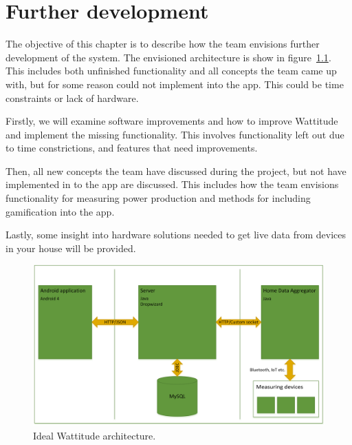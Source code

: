 \chapter{Further development}
\label{chapter:further}

The objective of this chapter is to describe how the team envisions further development of the system. The envisioned architecture is show in figure~\ref{fig:idealArchitecture}. This includes both unfinished functionality and all concepts the team came up with, but for some reason could not implement into the app. This could be time constraints or lack of hardware.

Firstly, we will examine software improvements and how to improve Wattitude and implement the missing functionality. This involves functionality left out due to time constrictions, and features that need improvements. 

Then, all new concepts the team have discussed during the project, but not have implemented in to the app are discussed. This includes how the team envisions functionality for measuring power production and methods for including gamification into the app. 

Lastly, some insight into hardware solutions needed to get live data from devices in your house will be provided. 

\begin{figure}[H]
\centering
\includegraphics[height=0.3\textheight]{ch/further/fig/architecture.png}
\caption{Ideal Wattitude architecture.}
\label{fig:idealArchitecture}
\end{figure}



